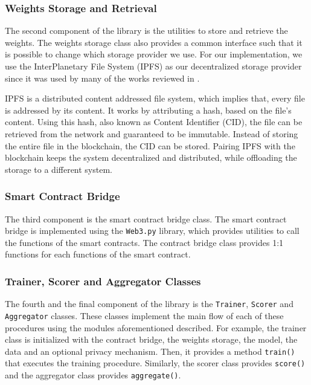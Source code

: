 \subsubsection{Weights Storage and Retrieval}

The second component of the library is the utilities to store and retrieve the weights. The weights storage class also provides a common interface such that it is possible to change which storage provider we use. For our implementation, we use the InterPlanetary File System (IPFS) \cite{10.48550/arxiv.1407.3561} as our decentralized storage provider since it was used by many of the works reviewed in .

IPFS is a distributed content addressed file system, which implies that, every file is addressed by its content. It works by attributing a hash, based on the file's content. Using this hash, also known as Content Identifier (CID), the file can be retrieved from the network and guaranteed to be immutable. Instead of storing the entire file in the blockchain, the CID can be stored. Pairing IPFS with the blockchain keeps the system decentralized and distributed, while offloading the storage to a different system.

\subsubsection{Smart Contract Bridge}\label{impl:bridge}

The third component is the smart contract bridge class. The smart contract bridge is implemented using the \texttt{Web3.py} \cite{web3py} library, which provides utilities to call the functions of the smart contracts. The contract bridge class provides 1:1 functions for each functions of the smart contract.

\subsubsection{Trainer, Scorer and Aggregator Classes}

The fourth and the final component of the library is the \texttt{Trainer}, \texttt{Scorer} and \texttt{Aggregator} classes. These classes implement the main flow of each of these procedures using the modules aforementioned described. For example, the trainer class is initialized with the contract bridge, the weights storage, the model, the data and an optional privacy mechanism. Then, it provides a method \texttt{train()} that executes the training procedure. Similarly, the scorer class provides \texttt{score()} and the aggregator class provides \texttt{aggregate()}.

